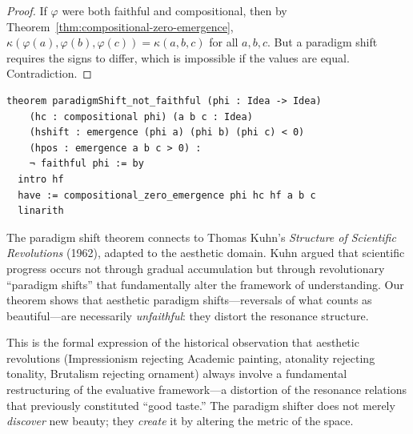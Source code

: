 \begin{proof}
If $\varphi$ were both faithful and compositional, then by
Theorem~\ref{thm:compositional-zero-emergence},
$\kappa(\varphi(a), \varphi(b), \varphi(c)) = \kappa(a, b, c)$ for all
$a, b, c$.  But a paradigm shift requires the signs to differ, which is
impossible if the values are equal.  Contradiction.
\end{proof}

\begin{lstlisting}
theorem paradigmShift_not_faithful (phi : Idea -> Idea)
    (hc : compositional phi) (a b c : Idea)
    (hshift : emergence (phi a) (phi b) (phi c) < 0)
    (hpos : emergence a b c > 0) :
    ¬ faithful phi := by
  intro hf
  have := compositional_zero_emergence phi hc hf a b c
  linarith
\end{lstlisting}

\begin{interpretation}
\label{int:paradigm-kuhn}
The paradigm shift theorem connects to Thomas Kuhn's \emph{Structure of
Scientific Revolutions} (1962), adapted to the aesthetic domain.  Kuhn
argued that scientific progress occurs not through gradual accumulation
but through revolutionary ``paradigm shifts'' that fundamentally alter
the framework of understanding.  Our theorem shows that aesthetic paradigm
shifts---reversals of what counts as beautiful---are necessarily
\emph{unfaithful}: they distort the resonance structure.

This is the formal expression of the historical observation that
aesthetic revolutions (Impressionism rejecting Academic painting,
atonality rejecting tonality, Brutalism rejecting ornament) always
involve a fundamental restructuring of the evaluative framework---a
distortion of the resonance relations that previously constituted
``good taste.''  The paradigm shifter does not merely \emph{discover}
new beauty; they \emph{create} it by altering the metric of the space.
\end{interpretation}

